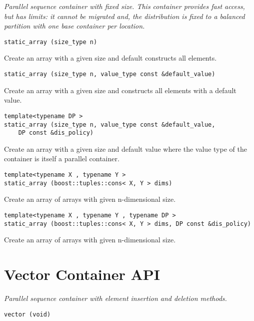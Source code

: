 \emph{Parallel sequence container with fixed size. 
This container provides fast access, but has limits: it cannot be migrated and, the distribution is fixed to a balanced partition with one base container per location. }

\begin{verbatim}
static_array (size_type n)
\end{verbatim}

Create an array with a given size and default constructs all elements. 
 
\begin{verbatim}
static_array (size_type n, value_type const &default_value)
\end{verbatim}

Create an array with a given size and constructs all elements with a default value. 
 
\begin{verbatim}
template<typename DP >
static_array (size_type n, value_type const &default_value, 
    DP const &dis_policy)
\end{verbatim}

Create an array with a given size and default value where the value type of the container is itself a parallel container. 
 
\begin{verbatim}
template<typename X , typename Y >
static_array (boost::tuples::cons< X, Y > dims)
\end{verbatim}

Create an array of arrays with given n-dimensional size. 
 
\begin{verbatim}
template<typename X , typename Y , typename DP >
static_array (boost::tuples::cons< X, Y > dims, DP const &dis_policy)
\end{verbatim}

Create an array of arrays with given n-dimensional size. 


\section{Vector Container API } \label{sec-vec-cont}

\emph{Parallel sequence container with element insertion and deletion methods. }

\begin{verbatim}
vector (void)
\end{verbatim}
 
